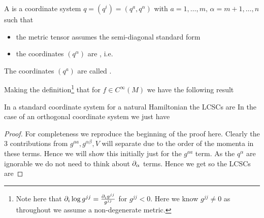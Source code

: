 \documentclass{article}
\begin{document}
\begin{definition}
A  is a coordinate system $q = (q^i) = (q^a, q^\alpha)$ with $a = 1, \dots, m, \, \alpha = m+1, \dots, n$ such that 
\begin{itemize}
    \item the metric tensor assumes the semi-diagonal standard form 
\item the coordinates $(q^\alpha)$ are , i.e. 
\end{itemize}
The coordinates $(q^a)$ are called .
\end{definition}

Making the definition\footnote{Note here that $\partial_i \log g^{jj} = \frac{\partial_i g^{jj}}{g^{jj}}$ for $g^{jj} < 0$. Here we know $g^{jj} \neq 0$ as throughout we assume a non-degenerate metric.} that for $f \in C^\infty(M)$
we have the following result

\begin{prop}
In a standard coordinate system for a natural Hamiltonian the LCSCs are 
In the case of an orthogonal coordinate system we just have 
\end{prop}
\begin{proof}
For completeness we reproduce the beginning of the proof here. Clearly the 3 contributions from $g^{aa}, g^{\alpha\beta},V$ will separate due to the order of the momenta in these terms. Hence we will show this initially just for the $g^{aa}$ term. As the $q^\alpha$ are ignorable we do not need to think about $\partial_\alpha$ terms. Hence we get
so the LCSCs are 
\end{proof}
\end{document}
